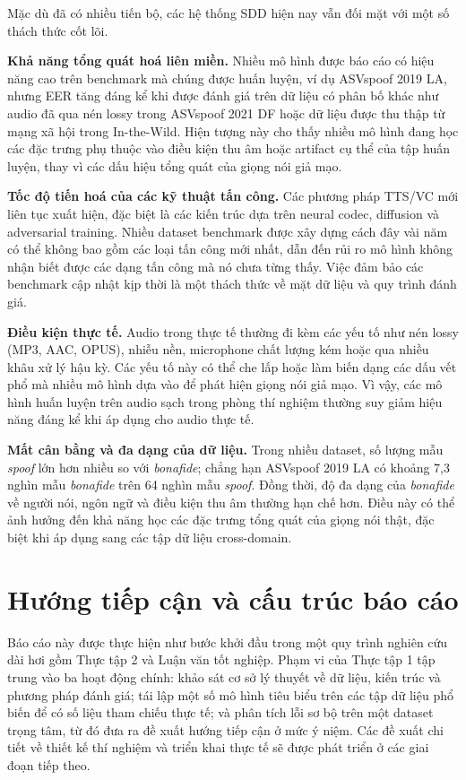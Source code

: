 Mặc dù đã có nhiều tiến bộ, các hệ thống SDD hiện nay vẫn đối mặt với một số thách thức cốt lõi.

\textbf{Khả năng tổng quát hoá liên miền.} Nhiều mô hình được báo cáo có hiệu năng cao trên benchmark mà chúng được huấn luyện, ví dụ ASVspoof 2019 LA, nhưng EER tăng đáng kể khi được đánh giá trên dữ liệu có phân bố khác như audio đã qua nén lossy trong ASVspoof 2021 DF hoặc dữ liệu được thu thập từ mạng xã hội trong In-the-Wild. Hiện tượng này cho thấy nhiều mô hình đang học các đặc trưng phụ thuộc vào điều kiện thu âm hoặc artifact cụ thể của tập huấn luyện, thay vì các dấu hiệu tổng quát của giọng nói giả mạo.

\textbf{Tốc độ tiến hoá của các kỹ thuật tấn công.} Các phương pháp TTS/VC mới liên tục xuất hiện, đặc biệt là các kiến trúc dựa trên neural codec, diffusion và adversarial training. Nhiều dataset benchmark được xây dựng cách đây vài năm có thể không bao gồm các loại tấn công mới nhất, dẫn đến rủi ro mô hình không nhận biết được các dạng tấn công mà nó chưa từng thấy. Việc đảm bảo các benchmark cập nhật kịp thời là một thách thức về mặt dữ liệu và quy trình đánh giá.

\textbf{Điều kiện thực tế.} Audio trong thực tế thường đi kèm các yếu tố như nén lossy (MP3, AAC, OPUS), nhiễu nền, microphone chất lượng kém hoặc qua nhiều khâu xử lý hậu kỳ. Các yếu tố này có thể che lấp hoặc làm biến dạng các dấu vết phổ mà nhiều mô hình dựa vào để phát hiện giọng nói giả mạo. Vì vậy, các mô hình huấn luyện trên audio sạch trong phòng thí nghiệm thường suy giảm hiệu năng đáng kể khi áp dụng cho audio thực tế.

\textbf{Mất cân bằng và đa dạng của dữ liệu.} Trong nhiều dataset, số lượng mẫu \textit{spoof} lớn hơn nhiều so với \textit{bonafide}; chẳng hạn ASVspoof 2019 LA có khoảng 7,3 nghìn mẫu \textit{bonafide} trên 64 nghìn mẫu \textit{spoof}. Đồng thời, độ đa dạng của \textit{bonafide} về người nói, ngôn ngữ và điều kiện thu âm thường hạn chế hơn. Điều này có thể ảnh hưởng đến khả năng học các đặc trưng tổng quát của giọng nói thật, đặc biệt khi áp dụng sang các tập dữ liệu cross-domain.

\section{Hướng tiếp cận và cấu trúc báo cáo}

Báo cáo này được thực hiện như bước khởi đầu trong một quy trình nghiên cứu dài hơi gồm Thực tập 2 và Luận văn tốt nghiệp. Phạm vi của Thực tập 1 tập trung vào ba hoạt động chính: khảo sát cơ sở lý thuyết về dữ liệu, kiến trúc và phương pháp đánh giá; tái lập một số mô hình tiêu biểu trên các tập dữ liệu phổ biến để có số liệu tham chiếu thực tế; và phân tích lỗi sơ bộ trên một dataset trọng tâm, từ đó đưa ra đề xuất hướng tiếp cận ở mức ý niệm. Các đề xuất chi tiết về thiết kế thí nghiệm và triển khai thực tế sẽ được phát triển ở các giai đoạn tiếp theo.

